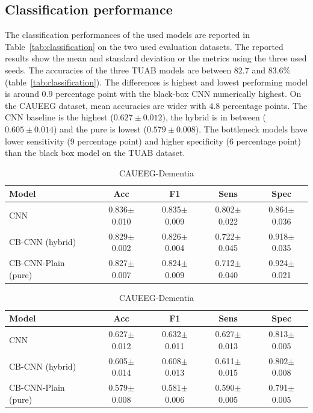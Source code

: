 \documentclass[journal,twoside,web]{ieeecolor}
\begin{document}
\subsection{Classification performance}
\label{sec:results_classification}
The classification performances of the used models are reported in Table~\ref{tab:classification} on the two used evaluation datasets. The reported results show the mean and standard deviation or the metrics using the three used seeds. The accuracies of the three TUAB models are between $82.7$ and $83.6\%$ (table~\ref{tab:classification}). The differences is highest and lowest performing model is around $0.9$ percentage point with the black-box CNN numerically highest. On the CAUEEG dataset, mean accuracies are wider with $4.8$ percentage points. The CNN baseline is the highest ($0.627 \pm 0.012$), the hybrid is in between ($0.605 \pm 0.014$) and the pure is lowest ($0.579 \pm 0.008$). The bottleneck models have lower sensitivity ($9$ percentage point) and higher specificity ($6$ percentage point) than the black box model on the TUAB dataset.   

\begin{table}[h]
\caption{Classification performance on TUAB (binary) and CAUEEG-Dementia (three-class) with mean $\pm$ std across three seeds ($42$, $43$, $44$).}
\label{tab:classification}
\centering

\begin{subtable}{\textwidth}
\centering
\begin{tabular}{l cccc}
\hline
Model & Acc & F1 & Sens & Spec \\
\hline
CNN
  & 0.836$\pm$0.010 & 0.835$\pm$0.009 & 0.802$\pm$0.022 & 0.864$\pm$0.036 \\
CB-CNN (hybrid)
  & 0.829$\pm$0.002 & 0.826$\pm$0.004 & 0.722$\pm$0.045 & 0.918$\pm$0.035  \\
CB-CNN-Plain (pure)
  & 0.827$\pm$0.007 & 0.824$\pm$0.009 & 0.712$\pm$0.040 & 0.924$\pm$0.021  \\
\hline
\end{tabular}
\caption{TUAB}
\label{tab:classification_tuab}
\end{subtable}

\vspace{1em}

\begin{subtable}{\textwidth}
\centering
\begin{tabular}{l cccc}
\hline
Model & Acc & F1 & Sens & Spec \\
\hline
CNN
  & 0.627$\pm$0.012 & 0.632$\pm$0.011 & 0.627$\pm$0.013 & 0.813$\pm$0.005  \\
CB-CNN (hybrid)
  & 0.605$\pm$0.014 & 0.608$\pm$0.013 & 0.611$\pm$0.015 & 0.802$\pm$0.008  \\
CB-CNN-Plain (pure)
  & 0.579$\pm$0.008 & 0.581$\pm$0.006 & 0.590$\pm$0.005 & 0.791$\pm$0.005  \\
\hline
\end{tabular}
\caption{CAUEEG-Dementia}
\label{tab:classification_caueeg}
\end{subtable}

\end{table}
\end{document}
